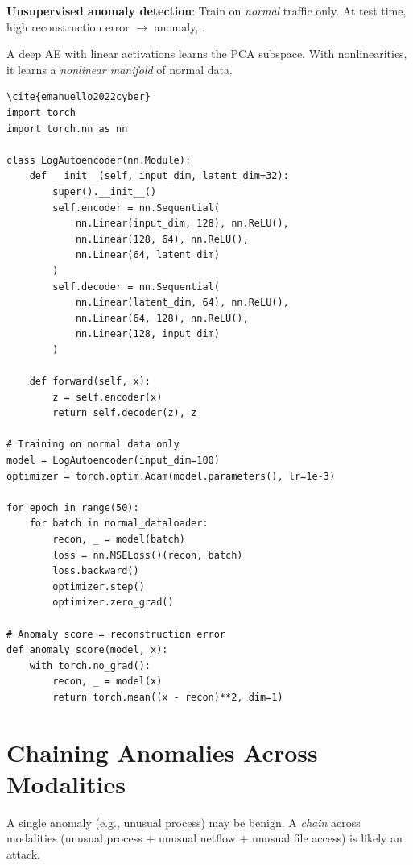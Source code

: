 \textbf{Unsupervised anomaly detection}: Train on \emph{normal} traffic only. At test time, high reconstruction error $\to$ anomaly, \cite{emanuello2022cyber}.

\begin{theorem}
A deep AE with linear activations learns the PCA subspace. With nonlinearities, it learns a \emph{nonlinear manifold} of normal data.
\end{theorem}

\begin{lstlisting}[style=python,caption=Autoencoder for log anomaly detection] \cite{emanuello2022cyber}
import torch
import torch.nn as nn

class LogAutoencoder(nn.Module):
    def __init__(self, input_dim, latent_dim=32):
        super().__init__()
        self.encoder = nn.Sequential(
            nn.Linear(input_dim, 128), nn.ReLU(),
            nn.Linear(128, 64), nn.ReLU(),
            nn.Linear(64, latent_dim)
        )
        self.decoder = nn.Sequential(
            nn.Linear(latent_dim, 64), nn.ReLU(),
            nn.Linear(64, 128), nn.ReLU(),
            nn.Linear(128, input_dim)
        )
    
    def forward(self, x):
        z = self.encoder(x)
        return self.decoder(z), z

# Training on normal data only
model = LogAutoencoder(input_dim=100)
optimizer = torch.optim.Adam(model.parameters(), lr=1e-3)

for epoch in range(50):
    for batch in normal_dataloader:
        recon, _ = model(batch)
        loss = nn.MSELoss()(recon, batch)
        loss.backward()
        optimizer.step()
        optimizer.zero_grad()

# Anomaly score = reconstruction error
def anomaly_score(model, x):
    with torch.no_grad():
        recon, _ = model(x)
        return torch.mean((x - recon)**2, dim=1)
\end{lstlisting}

\section{Chaining Anomalies Across Modalities}
\label{sec:cyber:chaining} \cite{emanuello2022cyber}

A single anomaly (e.g., unusual process) may be benign. A \emph{chain} across modalities (unusual process + unusual netflow + unusual file access) is likely an attack.

